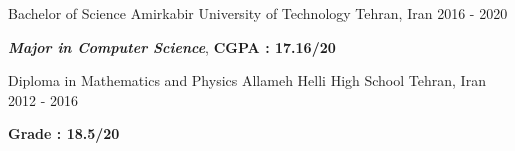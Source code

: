 \documentclass[11pt, a4paper]{awesome-cv}
\begin{document}
\begin{cventries}
	
	\cventry
	{Bachelor of Science} %
	{Amirkabir University of Technology} %
	{Tehran, Iran} %
	{ 2016 - 2020} %
	{
		\begin{cvitems} %
			\item {\textit{\textbf{Major in Computer Science}}, \textbf{CGPA : 17.16/20}}
		\end{cvitems}
	}
	\cventry
	{Diploma in Mathematics and Physics} %
	{Allameh Helli High School} %
	{Tehran, Iran} %
	{ 2012 - 2016} %
	{    
		\begin{cvitems} %
			\item {\textbf{Grade : 18.5/20}}\\
		\end{cvitems}
	}
\end{cventries}

\end{document}
